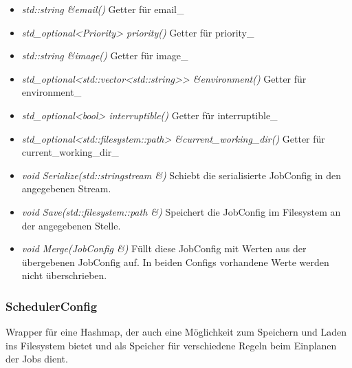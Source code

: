 \documentclass[a4paper,12pt]{article}
\begin{document}
\begin{itemize}[label={}]
\begin{itemize}[label={\textbullet}]
			\item \textit{std::string \&email()} Getter für email\_
			\item \textit{std\_optional<Priority> priority()} Getter für priority\_
			\item \textit{std::string \&image()} Getter für image\_
			\item \textit{std\_optional<std::vector<std::string>> \&environment()} Getter für environment\_
			\item \textit{std\_optional<bool> interruptible()} Getter für interruptible\_
			\item \textit{std\_optional<std::filesystem::path> \&current\_working\_dir()} Getter für current\_working\_dir\_
			\item \textit{void Serialize(std::stringstream \&)} Schiebt die serialisierte JobConfig in den angegebenen Stream.
			\item \textit{void Save(std::filesystem::path \&)} Speichert die JobConfig im Filesystem an der angegebenen Stelle. 
			\item \textit{void Merge(JobConfig \&)} Füllt diese JobConfig mit Werten aus der übergebenen JobConfig auf. In beiden Configs vorhandene Werte werden nicht überschrieben.
		\end{itemize}


\end{itemize}
\clearpage
\subsubsection{SchedulerConfig}

Wrapper für eine Hashmap, der auch eine Möglichkeit zum Speichern und Laden ins Filesystem bietet und als Speicher für verschiedene Regeln beim Einplanen der Jobs dient.
\end{document}
